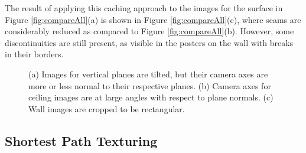 \documentclass[]{spie}  %
\begin{document}
The result of applying this caching approach to the images for the
surface in Figure \ref{fig:compareAll}(a) is shown in Figure
\ref{fig:compareAll}(c), where seams are considerably reduced as
compared to Figure \ref{fig:compareAll}(b). However, some
discontinuities are still present, as visible in the posters on the
wall with breaks in their borders.

\begin{figure}
  \centering
  \hspace{1in} \centering
  \centering \hspace{1in}
  \caption{(a) Images for vertical planes are tilted, but their camera
    axes are more or less normal to their respective planes. (b)
    Camera axes for ceiling images are at large angles with respect to
    plane normals. (c) Wall images are cropped to be rectangular.}
  \label{fig:projectionAngles}
\end{figure}

\subsection{Shortest Path Texturing}
\label{sec:shortestPath}
\end{document}
